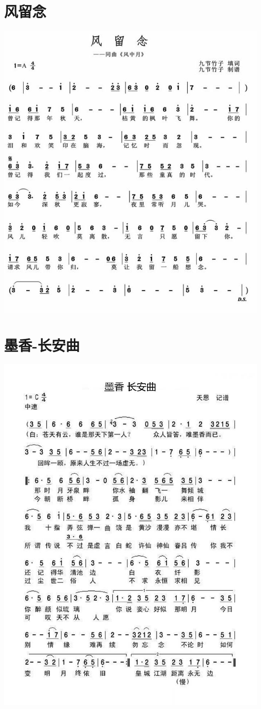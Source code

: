 \documentclass[cn,pad,chinese,chinesefont=nofont]{elegantbook}
\begin{document}
\section{风留念}
    \includegraphics[width=\textwidth]{dongxiao/202003231859风留念.jpg}
\section{墨香-长安曲}
    \includegraphics[width=\textwidth]{dongxiao/202003231859墨香-长安曲.jpg}
\end{document}
